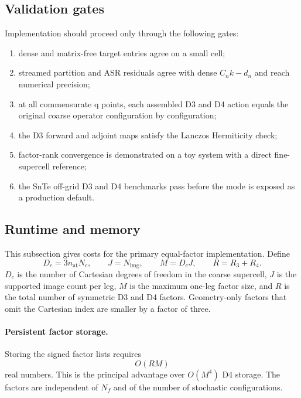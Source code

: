 \documentclass{article}
\newcommand{\Nc}{N_c}
\newcommand{\Nf}{N_f}
\begin{document}
\subsection{Validation gates}
\label{sec:implementation-gates}

Implementation should proceed only through the following gates:
\begin{enumerate}
    \item dense and matrix-free target entries agree on a small cell;
    \item streamed partition and ASR residuals agree with dense
    $C_nk-d_n$ and reach numerical precision;
    \item at all commensurate q points, each assembled D3 and D4 action
    equals the original coarse operator configuration by configuration;
    \item the D3 forward and adjoint maps satisfy the Lanczos Hermiticity
    check;
    \item factor-rank convergence is demonstrated on a toy system with a
    direct fine-supercell reference;
    \item the SnTe off-grid D3 and D4 benchmarks pass before the mode is
    exposed as a production default.
\end{enumerate}

\subsection{Runtime and memory}
\label{sec:runtime}

This subsection gives costs for the primary equal-factor implementation.
Define
\begin{equation}
    D_c=3n_{\mathrm{at}}\Nc,
    \qquad
    J=N_{\mathrm{img}},
    \qquad
    M=D_cJ,
    \qquad
    R=R_3+R_4.
    \label{eq:cost-symbols}
\end{equation}
$D_c$ is the number of Cartesian degrees of freedom in the coarse
supercell, $J$ is the supported image count per leg, $M$ is the maximum
one-leg factor size, and $R$ is the total number of symmetric D3 and D4
factors. Geometry-only factors that omit the Cartesian index are smaller by
a factor of three.

\paragraph{Persistent factor storage.}
Storing the signed factor lists requires
\begin{equation}
    O(RM)
    \label{eq:factor-storage}
\end{equation}
real numbers. This is the principal advantage over $O(M^4)$ D4 storage.
The factors are independent of $\Nf$ and of the number of stochastic
configurations.
\end{document}
